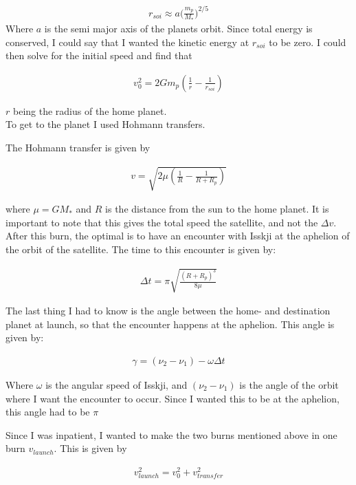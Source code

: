 \documentclass[a4paper, 10pt]{article}
\begin{document}
\begin{align}
r_{soi} \approx a \big( \frac{m_p}{M_*} \big) ^{2/5}
\end{align}
Where $a$ is the semi major axis of the planets orbit. Since total energy is conserved, I could say that I wanted the kinetic energy at $r_{soi}$ to be zero. I could then solve for the initial speed and find that 

\begin{align}
v_{0}^2 = 2Gm_p \left( \frac{1}{r} - \frac{1}{r_{soi}} \right) 
\end{align}

$r$ being the radius of the home planet. \\

To get to the planet I used Hohmann transfers\cite{SpaceDynamics}.

The Hohmann transfer is given by

\begin{align}
v = \sqrt{2\mu \left( \frac{1}{R} - \frac{1}{R + R_p} \right)}
\end{align}

where $\mu = GM_*$ and $R$ is the distance from the sun to the home planet. It is important to note that this gives the total speed the satellite, and not the $\Delta v$. \\

After this burn, the optimal is to have an encounter with Isskji at the aphelion of the orbit of the satellite. The time to this encounter is given by:

\begin{align}
\Delta t = \pi \sqrt{\frac{(R +R_p)^3}{8\mu}}
\end{align}

The last thing I had to know is the angle between the home- and destination planet at launch, so that the encounter happens at the aphelion. This angle is given by:

\begin{align}
\gamma = (\nu_2 -\nu_1) - \omega \Delta t
\end{align}

Where $\omega$ is the angular speed of Isskji, and $(\nu_2 -\nu_1)$ is the angle of the orbit  where I want the encounter to occur. Since I wanted this to be at the aphelion, this angle had to be $\pi$

Since I was inpatient, I wanted to make the two burns mentioned above in one burn $v_{launch}$. This is given by

\begin{align}
v_{launch}^2 = v_0^2 + v_{transfer}^2
\end{align} 
\end{document}
